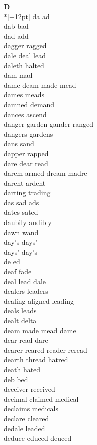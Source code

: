 \vspace{14pt}
\noindent\textbf{\Large D}\\*[+12pt]
da ad\\
dab bad\\
dad add\\
dagger ragged\\
dale deal lead\\
daleth halted\\
dam mad\\
dame deam made mead\\
dames meads\\
damned demand\\
dances ascend\\
danger garden gander ranged\\
dangers gardens\\
dans sand\\
dapper rapped\\
dare dear read\\
darem armed dream madre\\
darent ardent\\
darting trading\\
das sad ads\\
dates sated\\
daubily audibly\\
dawn wand\\
day's days'\\
days' day's\\
de ed\\
deaf fade\\
deal lead dale\\
dealers leaders\\
dealing aligned leading\\
deals leads\\
dealt delta\\
deam made mead dame\\
dear read dare\\
dearer reared reader reread\\
dearth thread hatred\\
death hated\\
deb bed\\
deceiver received\\
decimal claimed medical\\
declaims medicals\\
declare cleared\\
dedale leaded\\
deduce educed deuced\\
